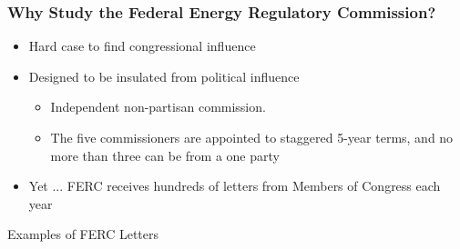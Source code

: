 \documentclass[13pt]{beamer}
\begin{document}
\begin{frame} 
\frametitle{Why Study the Federal Energy Regulatory Commission?}
\Large
\begin{itemize}
\item Hard case to find congressional influence
\item Designed to be insulated from political influence
\begin{itemize}
\item Independent non-partisan commission. 
\item The five commissioners are appointed to staggered 5-year terms, and no more than three can be from a one party

\end{itemize}
\item Yet ... FERC receives hundreds of letters from Members of Congress each year
\end{itemize}

\end{frame}
\begin{frame} 

\Large
\centering
Examples of FERC Letters
\end{frame}
\end{document}
